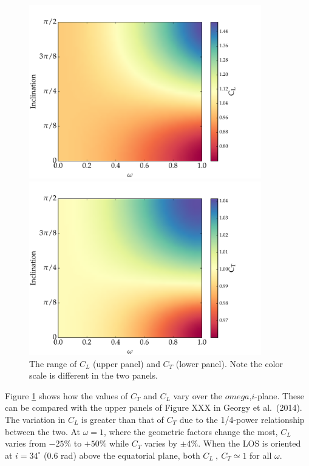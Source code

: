 \documentclass[12pt]{article}
\begin{document}
\begin{figure}
  \centering
  \includegraphics[width=0.9\textwidth]{../plots/C_L.pdf}
  
  \includegraphics[width=0.9\textwidth]{../plots/C_T.pdf}
  
  \caption{The range of $C_L$ (upper panel) and $C_T$ (lower panel). Note the
    color scale is different in the two panels. \label{fig:coeff}}
\end{figure}

Figure \ref{fig:coeff} shows how the values of $C_T$ and $C_L$ vary over the
$omega$,$i$-plane. These can be compared with the upper panels of Figure XXX
in Georgy et al.\ (2014). The variation in $C_L$ is greater than that of $C_T$
due to the 1/4-power relationship between the two. At $\omega=1$, where
the geometric factors change the most, $C_L$ varies from $-25\%$ to
$+50\%$ while $C_T$ varies by $\pm4\%$. When the LOS is oriented at
$i=34^{\circ}$ ($0.6$ rad) above the equatorial plane, both $C_L~,~C_T \simeq 1$
for all $\omega$.
\end{document}
